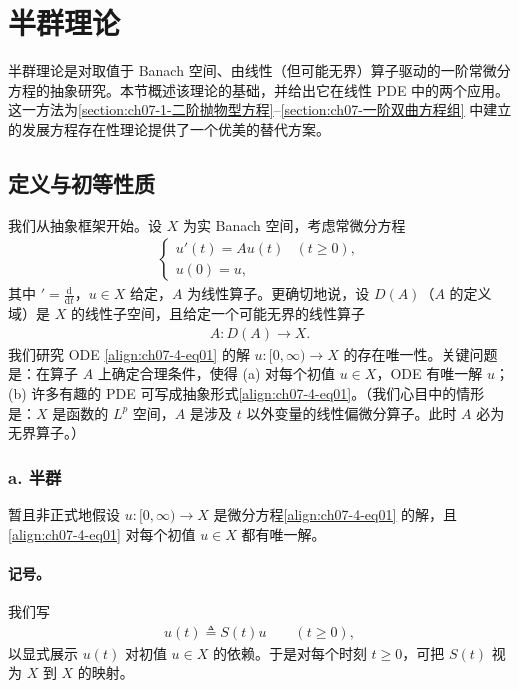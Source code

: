 \documentclass[../../main.tex]{subfiles}
\begin{document}
\section{半群理论}\label{section:ch07-4-半群理论}

半群理论是对取值于 Banach 空间、由线性（但可能无界）算子驱动的一阶常微分方程的抽象研究。本节概述该理论的基础，并给出它在线性 PDE 中的两个应用。这一方法为\cref{section:ch07-1-二阶抛物型方程}--\cref{section:ch07-一阶双曲方程组} 中建立的发展方程存在性理论提供了一个优美的替代方案。

\subsection{定义与初等性质}\label{subsection:ch07-4-1-定义与初等性质}

我们从抽象框架开始。设 $X$ 为实 Banach 空间，考虑常微分方程
\begin{align}
\begin{cases}
u'(t)=Au(t) & (t\geqslant 0),\\
u(0)=u,
\end{cases}\label{align:ch07-4-eq01}
\end{align}
其中 $'=\frac{\mathrm{d}}{\mathrm{d}t}$，$u\in X$ 给定，$A$ 为线性算子。更确切地说，设 $D(A)$（$A$ 的定义域）是 $X$ 的线性子空间，且给定一个可能无界的线性算子
\begin{align}
A:D(A)\to X.\label{align:ch07-4-eq02}
\end{align}
我们研究 ODE \eqref{align:ch07-4-eq01} 的解 $u:[0,\infty)\to X$ 的存在唯一性。关键问题是：在算子 $A$ 上确定合理条件，使得 (a) 对每个初值 $u\in X$，ODE 有唯一解 $u$；(b) 许多有趣的 PDE 可写成抽象形式\eqref{align:ch07-4-eq01}。（我们心目中的情形是：$X$ 是函数的 $L^p$ 空间，$A$ 是涉及 $t$ 以外变量的线性偏微分算子。此时 $A$ 必为无界算子。）

\subsubsection*{a. 半群}

暂且非正式地假设 $u:[0,\infty)\to X$ 是微分方程\eqref{align:ch07-4-eq01} 的解，且\eqref{align:ch07-4-eq01} 对每个初值 $u\in X$ 都有唯一解。

\paragraph{记号。}我们写
\begin{align}
u(t)\triangleq S(t)u\qquad (t\geqslant 0),\label{align:ch07-4-eq03}
\end{align}
以显式展示 $u(t)$ 对初值 $u\in X$ 的依赖。于是对每个时刻 $t\geqslant 0$，可把 $S(t)$ 视为 $X$ 到 $X$ 的映射。
\end{document}
